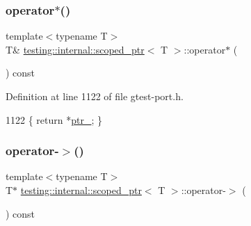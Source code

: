 \mbox{\label{classtesting_1_1internal_1_1scoped__ptr_a0aba95f68eceb6422a0b50b6f92047c2}} 
\subsubsection{\texorpdfstring{operator$\ast$()}{operator*()}}
{\footnotesize\ttfamily template$<$typename T$>$ \\
T\& \hyperlink{classtesting_1_1internal_1_1scoped__ptr}{testing\+::internal\+::scoped\+\_\+ptr}$<$ T $>$\+::operator$\ast$ (\begin{DoxyParamCaption}{ }\end{DoxyParamCaption}) const\hspace{0.3cm}{\ttfamily [inline]}}



Definition at line 1122 of file gtest-\/port.\+h.


\begin{DoxyCode}
1122 \{ \textcolor{keywordflow}{return} *\hyperlink{classtesting_1_1internal_1_1scoped__ptr_ab69d9f1f216ae91f8b8abca63e797397}{ptr\_}; \}
\end{DoxyCode}
\mbox{\label{classtesting_1_1internal_1_1scoped__ptr_a2b465830a322e2c3ea420e5ccf0472f4}} 
\subsubsection{\texorpdfstring{operator-\/$>$()}{operator->()}}
{\footnotesize\ttfamily template$<$typename T$>$ \\
T$\ast$ \hyperlink{classtesting_1_1internal_1_1scoped__ptr}{testing\+::internal\+::scoped\+\_\+ptr}$<$ T $>$\+::operator-\/$>$ (\begin{DoxyParamCaption}{ }\end{DoxyParamCaption}) const\hspace{0.3cm}{\ttfamily [inline]}}



